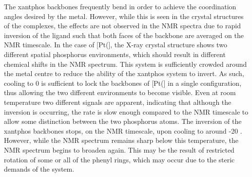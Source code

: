 The xantphos backbones frequently bend in order to achieve the coordination angles desired by the metal.  However, while this is seen in the crystal structures of the complexes, the effects are not observed in the NMR spectra due to rapid inversion of the ligand such that both faces of the backbone are averaged on the NMR timescale.  In the case of [Pt(\Phthixantphos{}], the X-ray crystal structure shows two different spatial phosphorus environments, which should result in different chemical shifts in the \phosphorus{} NMR spectrum.  This system is sufficiently crowded around the metal centre to reduce the ability of the xantphos system to invert.  As such, cooling to 0 \degC{} is sufficient to lock the backbones of [Pt(\Phthixantphos{}] in a single configuration, thus allowing the two different \phosphorus{} environments to become visible.  Even at room temperature two different signals are apparent, indicating that although the inversion is occurring, the rate is slow enough compared to the NMR timescale to allow some distinction between the two phosphorus atoms.  The inversion of the xantphos backbones stops, on the NMR timescale, upon cooling to around -20 \degC.  However, while the \phosphorus{} NMR spectrum remains sharp below this temperature, the \proton{} NMR spectrum begins to broaden again.  This may be the result of restricted rotation of some or all of the phenyl rings, which may occur due to the steric demands of the system.  

